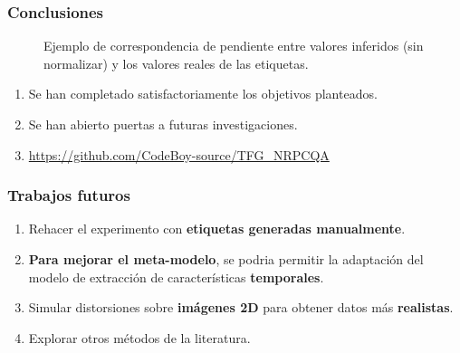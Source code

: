 \begin{frame}
    \frametitle{Conclusiones}
\begin{figure}
  \vspace{-.5cm}
  \hspace{-.2cm}\hspace{.2cm}
  \hspace{.2cm}
  \caption{Ejemplo de correspondencia de pendiente entre valores inferidos (sin normalizar) y 
  los valores reales de las etiquetas.} 
  \label{fig:Cualitativos}
\end{figure}
\vspace{-.5cm}
\begin{enumerate}
  \item Se han completado satisfactoriamente los objetivos planteados.
  \item Se han abierto puertas a futuras investigaciones.
  \item \url{https://github.com/CodeBoy-source/TFG_NRPCQA} 
\end{enumerate}
\end{frame}

\begin{frame}
  \frametitle{Trabajos futuros}
  \begin{enumerate}
    \item Rehacer el experimento con \textbf{etiquetas generadas manualmente}. 
    \item \textbf{Para mejorar el meta-modelo}, se podria \alert{permitir la adaptación} del modelo de extracción de características \textbf{temporales}.
    \item Simular distorsiones sobre \textbf{imágenes 2D} para obtener datos más \textbf{realistas}.
    \item Explorar \alert{otros métodos} de la literatura. 
  \end{enumerate}
\end{frame}


